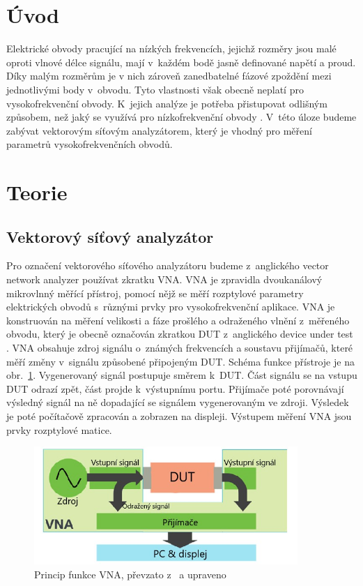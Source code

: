\documentclass{protokol}
\begin{document}
\headernoenv

\section{Úvod}
Elektrické obvody pracující na nízkých frekvencích,
jejichž rozměry jsou malé oproti vlnové délce signálu,
mají v~každém bodě jasně definované napětí a proud.
Díky malým rozměrům je v nich zároveň zanedbatelné fázové zpoždění
mezi jednotlivými body v~obvodu.
Tyto vlastnosti však obecně neplatí pro vysokofrekvenční obvody.
K~jejich analýze je potřeba přistupovat odlišným způsobem,
než jaký se využívá pro nízkofrekvenční obvody \cite{Pozar}.
V~této úloze budeme zabývat vektorovým síťovým analyzátorem,
který je vhodný pro měření parametrů vysokofrekvenčních obvodů.

\section{Teorie}

\subsection{Vektorový síťový analyzátor}

Pro označení vektorového síťového analyzátoru budeme z~anglického
vector network analyzer používat zkratku VNA.
VNA je zpravidla dvoukanálový mikrovlnný měřící přístroj,
pomocí nějž se měří rozptylové parametry elektrických obvodů
s~různými prvky pro vysokofrekvenční aplikace.
VNA je konstruován na měření velikosti a fáze prošlého a odraženého vlnění
z~měřeného obvodu,
který je obecně označován zkratkou DUT z~anglického device 
under test \cite{Pozar}.
VNA obsahuje zdroj signálu o~známých frekvencích a soustavu přijímačů,
které měří změny v~signálu způsobené připojeným DUT.
Schéma funkce přístroje je na obr.~\ref{VNA}.
Vygenerovaný signál postupuje směrem k~DUT.
Část signálu se na vstupu DUT odrazí zpět, část projde k~výstupnímu portu.
Přijímače poté porovnávají výsledný signál na ně dopadající
se signálem vygenerovaným ve zdroji.
Výsledek je poté počítačově zpracován a zobrazen na displeji.
Výstupem měření VNA jsou prvky rozptylové matice.

\begin{figure}[b]
	\centering
	\includegraphics[width=100mm,]{network-analyzer-diagram}
	\caption{Princip funkce VNA, převzato z~\cite{schema} a upraveno}
	\label{VNA}
\end{figure}
\end{document}
